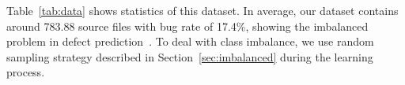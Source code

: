 Table~\ref{tab:data} shows statistics of this dataset. In average, our dataset contains around 783.88 source files with bug rate of 17.4\%, showing the imbalanced problem in defect prediction~\cite{wang2013using, khoshgoftaar2010attribute}. To deal with class imbalance, we use random sampling strategy described in Section~\ref{sec:imbalanced} during the learning process.




